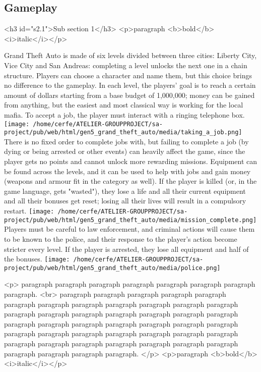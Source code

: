 \documentclass[a4paper,10pt]{book}
\begin{document}
 \subsection{Gameplay }
 <h3 id="s2.1">Sub section 1</h3>
        <p>paragraph <b>bold</b> <i>italic</i></p> 
 
          Grand Theft Auto is made of six levels divided between three cities: Liberty City, Vice City and San Andreas: completing a level unlocks the next one in a chain structure.
          Players can choose a character and name them, but this choice brings no difference to the gameplay. 
          In each level, the players' goal is to reach a certain amount of dollars starting from a base budget of 1,000,000; money can be gained from anything, but the easiest and most classical way is working for the local mafia. To accept a job, the player must interact with a ringing telephone box. 
 \texttt{[image: /home/cerfe/ATELIER-GROUPPROJECT/sa-project/pub/web/html/gen5\_grand\_theft\_auto/media/taking\_a\_job.png]}
          There is no fixed order to complete jobs with, but failing to complete a job (by dying or being arrested or other events) can heavily affect the game, since the player gets no points and cannot unlock more rewarding missions.  Equipment can be found across the levels, and it can be used to help with jobs and gain money (weapons and armour fit in the category as well). If the player is killed (or, in the game language, gets "wasted"), they lose a life and all their current equipment and all their bonuses get reset; losing all their lives will result in a compulsory restart. 
 \texttt{[image: /home/cerfe/ATELIER-GROUPPROJECT/sa-project/pub/web/html/gen5\_grand\_theft\_auto/media/mission\_complete.png]}
 Players must be careful to law enforcement, and criminal actions will cause them to be known to the police, and their response to the player's action become stricter every level. If the player is arrested, they lose all equipment and half of the bonuses. 
 \texttt{[image: /home/cerfe/ATELIER-GROUPPROJECT/sa-project/pub/web/html/gen5\_grand\_theft\_auto/media/police.png]}
 
 <p>
          paragraph paragraph paragraph paragraph paragraph paragraph paragraph paragraph. <br>
          paragraph paragraph paragraph paragraph paragraph paragraph paragraph paragraph paragraph paragraph paragraph paragraph paragraph paragraph paragraph paragraph paragraph paragraph paragraph paragraph paragraph paragraph paragraph paragraph paragraph paragraph paragraph paragraph paragraph paragraph paragraph paragraph paragraph paragraph paragraph paragraph paragraph paragraph paragraph paragraph paragraph paragraph paragraph paragraph.
        </p>
        <p>paragraph <b>bold</b> <i>italic</i></p> 
\end{document}
